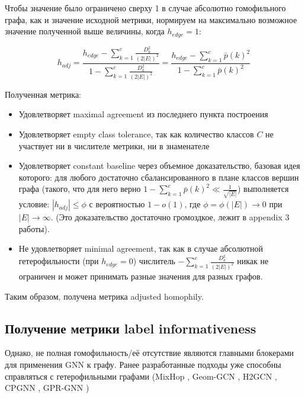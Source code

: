 \documentclass[a4paper,14pt]{article}
\begin{document}
	Чтобы значение было ограничено сверху 1 в случае абсолютно гомофильного графа, как и значение исходной метрики, нормируем на максимально возможное значение полученной выше величины, когда $ h_{edge} = 1 $:
	
	$$ h_{adj} = \frac{ h_{edge} - \sum_{k=1}^{c} \frac{D_k^2}{(2|E|)^2} }{ 1 - \sum_{k=1}^{c} \frac{D_k^2}{(2|E|)^2}} = \frac{ h_{edge} - \sum_{k=1}^{c} \bar{p}(k)^2 }{1 - \sum_{k=1}^{c} \bar{p}(k)^2 } $$
	
	Полученная метрика:
	
	\begin{itemize}
	
		\item Удовлетворяет maximal agreement из последнего пункта построения
		
		\item Удовлетворяет empty class tolerance, так как количество классов $C$ не участвует ни в числителе метрики, ни в знаменателе
		
		\item Удовлетворяет constant baseline через объемное доказательство, базовая идея которого: для любого достаточно сбалансированного в плане классов вершин графа (такого, что для него верно $ 1 - \sum_{k=1}^{c} \bar{p}(k)^2 \ll \frac{1}{\sqrt{|E|}} $) выполняется условие: $|h_{adj}| \leq \phi$ с вероятностью $1 - o(1)$, где $\phi = \phi (|E|) \rightarrow 0 $ при $|E| \rightarrow \infty$.
		(Это доказательство достаточно громоздкое, лежит в appendix 3 работы).
		
		\item Не удовлетворяет minimal agreement, так как в случае абсолютной гетерофильности (при $ h_{edge} = 0 $) числитель $ - \sum_{k=1}^{c} \frac{D_k^2}{(2|E|)^2} $ никак не ограничен и может принимать разные значения для разных графов.
		
	\end{itemize}

	Таким образом, получена метрика adjusted homophily.
	
	\subsection{Получение метрики label informativeness}
	
	Однако, не полная гомофильность/её отсутствие являются главными блокерами для применения GNN к графу. 
	Ранее разработанные подходы уже способны справляться с гетерофильными графами (MixHop \cite{abu2019mixhop}, Geom-GCN \cite{pei2020geom}, H2GCN \cite{zhu2020beyond}, CPGNN \cite{zhu2021graph}, GPR-GNN \cite{chien2020adaptive})
	
\end{document}
